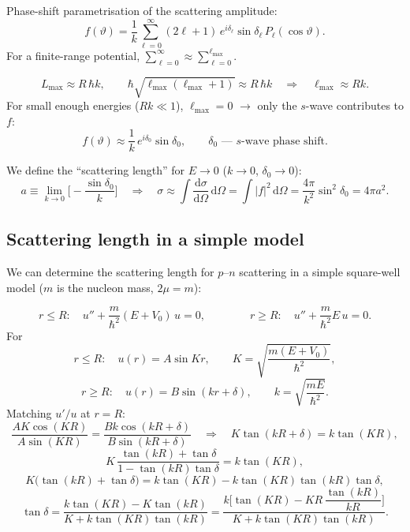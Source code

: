 \documentclass[11pt,a4paper]{article}
\newcommand{\ud}{\mathrm{d}}
\begin{document}
Phase-shift parametrisation of the scattering amplitude:
\[
f(\vartheta)=\frac1k\sum_{\ell=0}^{\infty}(2\ell+1)\,e^{i\delta_\ell}\sin\delta_\ell\,P_\ell(\cos\vartheta).
\]
For a finite-range potential, $\displaystyle\sum_{\ell=0}^{\infty}\approx\sum_{\ell=0}^{\ell_{\max}}$.

\begin{center}
\end{center}
\[
L_{\max}\approx R\,\hbar k,\qquad
\hbar\sqrt{\ell_{\max}(\ell_{\max}+1)}\approx R\,\hbar k
\quad\Rightarrow\quad \ell_{\max}\approx Rk .
\]
For small enough energies ($Rk\ll1$), $\ell_{\max}=0$ $\to$ only the $s$-wave
contributes to $f$:
\[
f(\vartheta)\approx\frac1k\,e^{i\delta_0}\sin\delta_0,
\qquad \delta_0 \text{ --- $s$-wave phase shift.}
\]

We define the ``scattering length'' for $E\to0$ ($k\to0$, $\delta_0\to0$):
\[
a\equiv\lim_{k\to0}\Big[-\frac{\sin\delta_0}{k}\Big]
\quad\Rightarrow\quad
\sigma\approx\int\frac{\ud\sigma}{\ud\Omega}\,\ud\Omega=\int|f|^2\,\ud\Omega
=\frac{4\pi}{k^2}\sin^2\delta_0=4\pi a^2 .
\]

\subsection{Scattering length in a simple model}

We can determine the scattering length for $p$--$n$ scattering in a simple
square-well model ($m$ is the nucleon mass, $2\mu=m$):

\begin{center}
\end{center}
\[
r\le R:\quad u''+\frac{m}{\hbar^2}(E+V_0)\,u=0,
\qquad\qquad
r\ge R:\quad u''+\frac{m}{\hbar^2}E\,u=0 .
\]
For
\[
r\le R:\quad u(r)=A\sin Kr,\qquad K=\sqrt{\frac{m(E+V_0)}{\hbar^2}},
\]
\[
r\ge R:\quad u(r)=B\sin(kr+\delta),\qquad k=\sqrt{\frac{mE}{\hbar^2}} .
\]
Matching $u'/u$ at $r=R$:
\[
\frac{AK\cos(KR)}{A\sin(KR)}=\frac{Bk\cos(kR+\delta)}{B\sin(kR+\delta)}
\quad\Rightarrow\quad
K\tan(kR+\delta)=k\tan(KR),
\]
\[
K\,\frac{\tan(kR)+\tan\delta}{1-\tan(kR)\tan\delta}=k\tan(KR),
\]
\[
K\big(\tan(kR)+\tan\delta\big)=k\tan(KR)-k\tan(KR)\tan(kR)\tan\delta,
\]
\[
\tan\delta=\frac{k\tan(KR)-K\tan(kR)}{K+k\tan(KR)\tan(kR)}
=\frac{k\Big[\tan(KR)-KR\,\dfrac{\tan(kR)}{kR}\Big]}{K+k\tan(KR)\tan(kR)} .
\]
\end{document}
